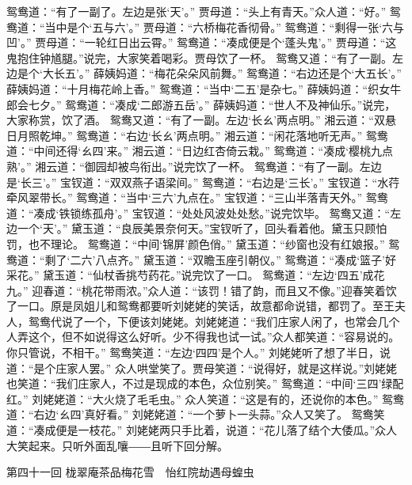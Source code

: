 \documentclass[12pt,oneside]{book}
\begin{document}
鸳鸯道：“有了一副了。左边是张‘天’。”
贾母道：“头上有青天。”众人道：“好。”
鸳鸯道：“当中是个‘五与六’。”
贾母道：“六桥梅花香彻骨。”
鸳鸯道：“剩得一张‘六与凹’。”
贾母道：“一轮红日出云霄。”
鸳鸯道：“凑成便是个‘蓬头鬼’。”
贾母道：“这鬼抱住钟馗腿。”说完，大家笑着喝彩。贾母饮了一杯。
鸳鸯又道：“有了一副。左边是个‘大长五’。”
薛姨妈道：“梅花朵朵风前舞。”
鸳鸯道：“右边还是个‘大五长’。”
薛姨妈道：“十月梅花岭上香。”
鸳鸯道：“当中‘二五’是杂七。”
薛姨妈道：“织女牛郎会七夕。”
鸳鸯道：“凑成‘二郎游五岳’。”
薛姨妈道：“世人不及神仙乐。”说完，大家称赏，饮了酒。
鸳鸯又道：“有了一副。左边‘长ㄠ’两点明。”
湘云道：“双悬日月照乾坤。”
鸳鸯道：“右边‘长ㄠ’两点明。”
湘云道：“闲花落地听无声。”
鸳鸯道：“中间还得‘ㄠ四’来。”
湘云道：“日边红杏倚云栽。”
鸳鸯道：“凑成‘樱桃九点熟’。”
湘云道：“御园却被鸟衔出。”说完饮了一杯。
鸳鸯道：“有了一副。左边是‘长三’。”
宝钗道：“双双燕子语梁间。”
鸳鸯道：“右边是‘三长’。”
宝钗道：“水荇牵风翠带长。”
鸳鸯道：“当中‘三六’九点在。”
宝钗道：“三山半落青天外。”
鸳鸯道：“凑成‘铁锁练孤舟’。”
宝钗道：“处处风波处处愁。”说完饮毕。
鸳鸯又道：“左边一个‘天’。”
黛玉道：“良辰美景奈何天。”宝钗听了，回头看着他。黛玉只顾怕罚，也不理论。
鸳鸯道：“中间‘锦屏’颜色俏。”
黛玉道：“纱窗也没有红娘报。”
鸳鸯道：“剩了‘二六’八点齐。”
黛玉道：“双瞻玉座引朝仪。”
鸳鸯道：“凑成‘篮子’好采花。”
黛玉道：“仙杖香挑芍药花。”说完饮了一口。
鸳鸯道：“左边‘四五’成花九。”
迎春道：“桃花带雨浓。”众人道：“该罚！错了韵，而且又不像。”迎春笑着饮了一口。原是凤姐儿和鸳鸯都要听刘姥姥的笑话，故意都命说错，都罚了。至王夫人，鸳鸯代说了一个，下便该刘姥姥。刘姥姥道：“我们庄家人闲了，也常会几个人弄这个，但不如说得这么好听。少不得我也试一试。”众人都笑道：“容易说的。你只管说，不相干。”
鸳鸯笑道：“左边‘四四’是个人。”
刘姥姥听了想了半日，说道：“是个庄家人罢。”
众人哄堂笑了。贾母笑道：“说得好，就是这样说。”刘姥姥也笑道：“我们庄家人，不过是现成的本色，众位别笑。”
鸳鸯道：“中间‘三四’绿配红。”
刘姥姥道：“大火烧了毛毛虫。”
众人笑道：“这是有的，还说你的本色。”
鸳鸯道：“右边‘ㄠ四’真好看。”
刘姥姥道：“一个萝卜一头蒜。”众人又笑了。
鸳鸯笑道：“凑成便是一枝花。”
刘姥姥两只手比着，说道：“花儿落了结个大倭瓜。”众人大笑起来。只听外面乱嚷――且听下回分解。

 
第四十一回  栊翠庵茶品梅花雪　怡红院劫遇母蝗虫
\end{document}
